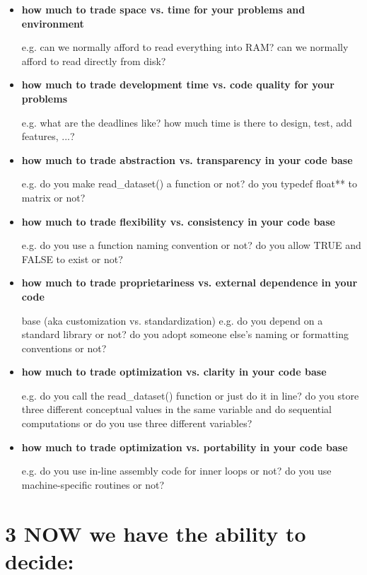 \begin{itemize}
\item {\bf how much to trade space vs. time for your problems and environment}

		e.g. can we normally afford to read everything into RAM?  can we 
			normally afford to read directly from disk?

\item {\bf how much to trade development time vs. code quality for your 
	problems}

		e.g. what are the deadlines like?  how much time is there to design,
			test, add features, ...?

\item {\bf how much to trade abstraction vs. transparency in your code base}

		e.g. do you make read\_dataset() a function or not?  do you typedef
			float** to matrix or not?

\item {\bf how much to trade flexibility vs. consistency in your code base}

		e.g. do you use a function naming convention or not?  do you allow
			TRUE and FALSE to exist or not?

\item {\bf how much to trade proprietariness vs. external dependence in your 
	code}

		base (aka customization vs. standardization)
		e.g. do you depend on a standard library or not?  do you adopt someone
			else's naming or formatting conventions or not?

\item {\bf how much to trade optimization vs. clarity in your code base}

		e.g. do you call the read\_dataset() function or just do it in line?
			do you store three different conceptual values in the same variable
				and do sequential computations or do you use three different
				variables?

\item {\bf how much to trade optimization vs. portability in your code base}

		e.g. do you use in-line assembly code for inner loops or not?  do you
			use machine-specific routines or not?
\end{itemize}

\pagebreak
\section*{3  NOW we have the ability to decide:}

